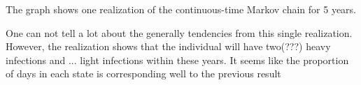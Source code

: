 The graph shows one realization of the continuous-time Markov chain for 5 years.

One can not tell a lot about the generally tendencies from this single realization. 
However, the realization shows that the individual will have two(???) heavy infections and ... light infections within these years. It seems like the proportion of days in each state is corresponding well to the previous result

